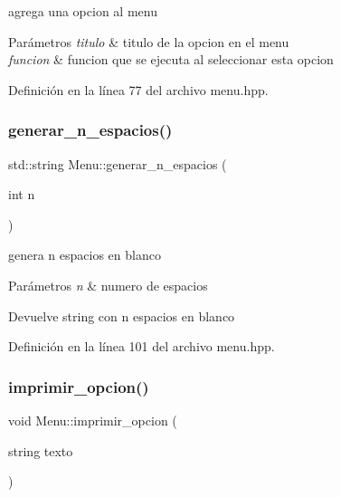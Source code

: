 agrega una opcion al menu 


\begin{DoxyParams}{Parámetros}
{\em titulo} & titulo de la opcion en el menu \\
\hline
{\em funcion} & funcion que se ejecuta al seleccionar esta opcion \\
\hline
\end{DoxyParams}


Definición en la línea 77 del archivo menu.\+hpp.

\mbox{\label{classMenu_a67ebd3e3bcfe45c99a7c0ff13a5c3ebb}} 
\subsubsection{\texorpdfstring{generar\+\_\+n\+\_\+espacios()}{generar\_n\_espacios()}}
{\footnotesize\ttfamily std\+::string Menu\+::generar\+\_\+n\+\_\+espacios (\begin{DoxyParamCaption}\item[{int}]{n }\end{DoxyParamCaption})\hspace{0.3cm}{\ttfamily [inline]}}



genera n espacios en blanco 


\begin{DoxyParams}{Parámetros}
{\em n} & numero de espacios \\
\hline
\end{DoxyParams}
\begin{DoxyReturn}{Devuelve}
string con n espacios en blanco 
\end{DoxyReturn}


Definición en la línea 101 del archivo menu.\+hpp.

\mbox{\label{classMenu_aa964e3e58eb5c6b63ebadd7f2ec6751a}} 
\subsubsection{\texorpdfstring{imprimir\+\_\+opcion()}{imprimir\_opcion()}}
{\footnotesize\ttfamily void Menu\+::imprimir\+\_\+opcion (\begin{DoxyParamCaption}\item[{string}]{texto }\end{DoxyParamCaption})\hspace{0.3cm}{\ttfamily [inline]}}



